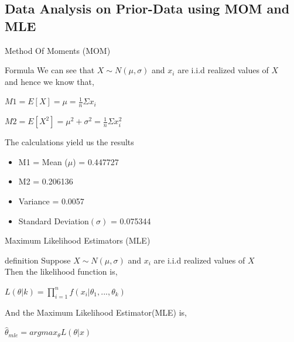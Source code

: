 \documentclass{beamer}
\begin{document}
\begin{frame}
\section{Data Analysis on Prior-Data using MOM and MLE}
\end{frame}
\begin{frame}{Method Of Moments (MOM)}
    \begin{block}{Formula}
    We can see that $X \sim N(\mu,\sigma)$ and $x_i$ are i.i.d realized values of $X$\\
    and hence we know that,
    \begin{center}
    $M1=E[X] = \mu = \frac{1}{n}\Sigma x_{i}$  
\end{center}

\begin{center}
    $M2=E[X^2] = \mu^2 + \sigma^2 = \frac{1}{n}\Sigma x_{i}^{2}$
\end{center}
    \end{block}
The calculations yield us the results
\begin{itemize}
    \item M1 = Mean ($\mu$) = 0.447727
    \item M2 = 0.206136
    \item Variance = 0.0057
    \item Standard Deviation$(\sigma)$ = 0.075344
\end{itemize}
\end{frame}
\begin{frame}{Maximum Likelihood Estimators (MLE)}
\begin{block}{definition}
Suppose $X \sim N(\mu,\sigma)$ and $x_i$ are i.i.d realized values of $X$\\
Then the likelihood function is,\\
\begin{center}
    $L(\theta|k) = \prod_{i=1}^n f(x_i|\theta_1,...,\theta_k)$
\end{center}
And the Maximum Likelihood Estimator(MLE) is,
\begin{center}
    $\hat{\theta}_{mle} = argmax_{\theta} L(\theta|x)$
\end{center}
    
\end{block}  
\end{frame}
\end{document}
